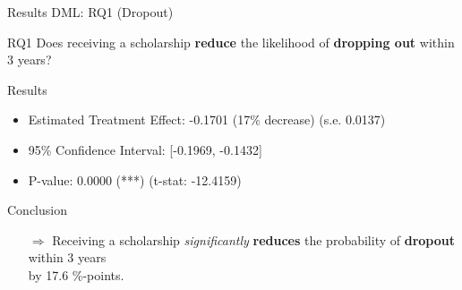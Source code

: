 \documentclass[aspectratio=169]{beamer}
\begin{document}
\begin{frame}{Results DML: RQ1 (Dropout)}
\vspace{20pt}
    \begin{alertblock}{RQ1}
	Does receiving a scholarship \textbf{reduce} the likelihood of \textbf{dropping out} within 3 years?
	\end{alertblock}

\begin{block}{Results}
\begin{itemize}[label=--,itemsep=1pt,topsep=2pt]
	\item Estimated Treatment Effect: -0.1701 (17\% decrease) (s.e. 0.0137)
	\item 95\% Confidence Interval: [-0.1969, -0.1432]
	\item P-value: 0.0000 (***) (t-stat: -12.4159)
\end{itemize}
\end{block}

\begin{exampleblock}{Conclusion}
\vspace{-3pt}
\begin{itemize}
	\item [$\Rightarrow$]Receiving a scholarship \textit{significantly} \textbf{reduces} the probability of \textbf{dropout} within 3 years \\ by 17.6 \%-points. 
\end{itemize}
\vspace{-3pt}
\end{exampleblock}

\end{frame}
\end{document}
